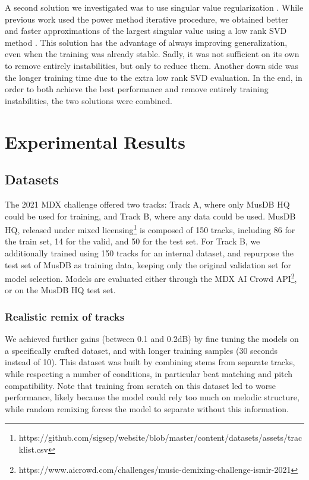 \documentclass[10pt,a4paper,onecolumn]{article}
\begin{document}
A second solution we investigated was to use singular value
regularization \citep{spectral}. While previous work used the power
method iterative procedure, we obtained better and faster approximations
of the largest singular value using a low rank SVD method
\citep{lowranksvd}. This solution has the advantage of always improving
generalization, even when the training was already stable. Sadly, it was
not sufficient on its own to remove entirely instabilities, but only to
reduce them. Another down side was the longer training time due to the
extra low rank SVD evaluation. In the end, in order to both achieve the
best performance and remove entirely training instabilities, the two
solutions were combined.

\newpage

\hypertarget{experimental-results}{%
\section{Experimental Results}\label{experimental-results}}

\hypertarget{datasets}{%
\subsection{Datasets}\label{datasets}}

The 2021 MDX challenge \citep{mdx} offered two tracks: Track A, where
only MusDB HQ \citep{musdbhq} could be used for training, and Track B,
where any data could be used. MusDB HQ, released under mixed
licensing\footnote{https://github.com/sigsep/website/blob/master/content/datasets/assets/tracklist.csv}
is composed of 150 tracks, including 86 for the train set, 14 for the
valid, and 50 for the test set. For Track B, we additionally trained
using 150 tracks for an internal dataset, and repurpose the test set of
MusDB as training data, keeping only the original validation set for
model selection. Models are evaluated either through the MDX AI Crowd
API\footnote{https://www.aicrowd.com/challenges/music-demixing-challenge-ismir-2021},
or on the MusDB HQ test set.

\hypertarget{realistic-remix-of-tracks}{%
\subsubsection{Realistic remix of
tracks}\label{realistic-remix-of-tracks}}

We achieved further gains (between 0.1 and 0.2dB) by fine tuning the
models on a specifically crafted dataset, and with longer training
samples (30 seconds instead of 10). This dataset was built by combining
stems from separate tracks, while respecting a number of conditions, in
particular beat matching and pitch compatibility. Note that training
from scratch on this dataset led to worse performance, likely because
the model could rely too much on melodic structure, while random
remixing forces the model to separate without this information.
\end{document}
